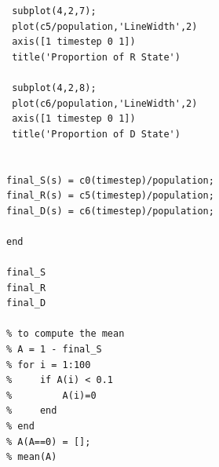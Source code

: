 \documentclass[10pt]{article}
\begin{document}
\begin{verbatim}
 subplot(4,2,7);
 plot(c5/population,'LineWidth',2)
 axis([1 timestep 0 1])
 title('Proportion of R State')
 
 subplot(4,2,8);
 plot(c6/population,'LineWidth',2)
 axis([1 timestep 0 1])
 title('Proportion of D State')


final_S(s) = c0(timestep)/population;
final_R(s) = c5(timestep)/population;
final_D(s) = c6(timestep)/population;

end

final_S
final_R
final_D

% to compute the mean
% A = 1 - final_S
% for i = 1:100
%     if A(i) < 0.1
%         A(i)=0
%     end
% end
% A(A==0) = [];
% mean(A)


\end{verbatim}
\end{document}
